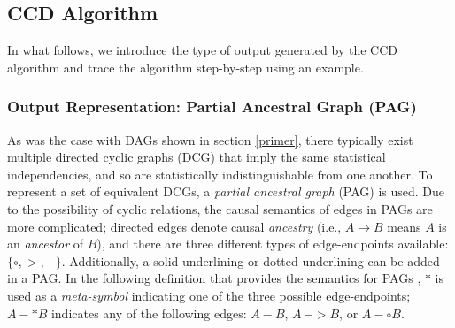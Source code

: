 \documentclass[twoside, 11pt]{article}
\newcommand{\tikzxmark}{%
\tikz[scale=0.23] {
    \draw[line width=0.7,line cap=round] (0,0) to [bend left=6] (1,1);
    \draw[line width=0.7,line cap=round] (0.2,0.95) to [bend right=3] (0.8,0.05);
}}
\begin{document}






\subsection{CCD Algorithm}
In what follows, we introduce the type of output generated by the CCD algorithm and trace the algorithm step-by-step using an example. 



\subsubsection{Output Representation: Partial Ancestral Graph (PAG)}

As was the case with DAGs shown in section \ref{primer}, there typically exist multiple directed cyclic graphs (DCG) that imply the same statistical independencies, and so are statistically indistinguishable from one another. To represent a set of equivalent DCGs, a \textit{partial ancestral graph} (PAG) is used. Due to the possibility of cyclic relations, the causal semantics of edges in PAGs are more complicated; directed edges denote causal \textit{ancestry} (i.e., $A \rightarrow B$ means $A$ is an \textit{ancestor} of $B$), and there are three different types of edge-endpoints available: $\{ \circ, > , -  \}$. Additionally, a solid underlining or dotted underlining can be added in a PAG. In the following definition that provides the semantics for PAGs \citep{Richardson1996a}, $*$ is used as a \textit{meta-symbol} indicating one of the three possible edge-endpoints; $A -*B$ indicates any of the following edges: $A-B$, $A\,->B$, or $A-\circ B$.
\end{document}
